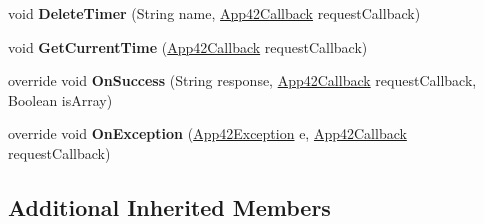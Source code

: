 \begin{DoxyCompactItemize}
\item 
\hypertarget{classcom_1_1shephertz_1_1app42_1_1paas_1_1sdk_1_1windows_1_1timer_1_1_timer_service_a40f271ee1a4de2fdce0ba3bd6ee7f5fb}{void {\bfseries Delete\+Timer} (String name, \hyperlink{interfacecom_1_1shephertz_1_1app42_1_1paas_1_1sdk_1_1windows_1_1_app42_callback}{App42\+Callback} request\+Callback)}\label{classcom_1_1shephertz_1_1app42_1_1paas_1_1sdk_1_1windows_1_1timer_1_1_timer_service_a40f271ee1a4de2fdce0ba3bd6ee7f5fb}

\item 
\hypertarget{classcom_1_1shephertz_1_1app42_1_1paas_1_1sdk_1_1windows_1_1timer_1_1_timer_service_aea9cc8fa5611c6b1b602098a7005a37f}{void {\bfseries Get\+Current\+Time} (\hyperlink{interfacecom_1_1shephertz_1_1app42_1_1paas_1_1sdk_1_1windows_1_1_app42_callback}{App42\+Callback} request\+Callback)}\label{classcom_1_1shephertz_1_1app42_1_1paas_1_1sdk_1_1windows_1_1timer_1_1_timer_service_aea9cc8fa5611c6b1b602098a7005a37f}

\item 
\hypertarget{classcom_1_1shephertz_1_1app42_1_1paas_1_1sdk_1_1windows_1_1timer_1_1_timer_service_a45c572947ab4c0296688efdd3ab942de}{override void {\bfseries On\+Success} (String response, \hyperlink{interfacecom_1_1shephertz_1_1app42_1_1paas_1_1sdk_1_1windows_1_1_app42_callback}{App42\+Callback} request\+Callback, Boolean is\+Array)}\label{classcom_1_1shephertz_1_1app42_1_1paas_1_1sdk_1_1windows_1_1timer_1_1_timer_service_a45c572947ab4c0296688efdd3ab942de}

\item 
\hypertarget{classcom_1_1shephertz_1_1app42_1_1paas_1_1sdk_1_1windows_1_1timer_1_1_timer_service_abb6ff0bbc56799e00e5d024195373533}{override void {\bfseries On\+Exception} (\hyperlink{classcom_1_1shephertz_1_1app42_1_1paas_1_1sdk_1_1windows_1_1_app42_exception}{App42\+Exception} e, \hyperlink{interfacecom_1_1shephertz_1_1app42_1_1paas_1_1sdk_1_1windows_1_1_app42_callback}{App42\+Callback} request\+Callback)}\label{classcom_1_1shephertz_1_1app42_1_1paas_1_1sdk_1_1windows_1_1timer_1_1_timer_service_abb6ff0bbc56799e00e5d024195373533}

\end{DoxyCompactItemize}
\subsection*{Additional Inherited Members}
